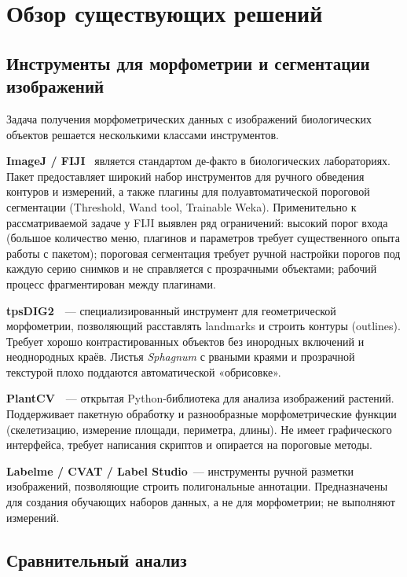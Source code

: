 
\section{Обзор существующих решений}
\label{sec:relatedworks}

\subsection{Инструменты для морфометрии и сегментации изображений}

Задача получения морфометрических данных с изображений биологических объектов решается несколькими классами инструментов.

\textbf{ImageJ / FIJI}~\cite{Schindelin2012} является стандартом де-факто в биологических
лабораториях. Пакет предоставляет широкий набор инструментов для ручного обведения контуров
и измерений, а также плагины для полуавтоматической пороговой сегментации (Threshold,
Wand tool, Trainable Weka). Применительно к рассматриваемой задаче у FIJI выявлен ряд
ограничений: высокий порог входа (большое количество меню, плагинов и параметров требует
существенного опыта работы с пакетом); пороговая сегментация требует ручной настройки порогов
под каждую серию снимков и не справляется с прозрачными объектами; рабочий процесс
фрагментирован между плагинами.

\textbf{tpsDIG2}~\cite{Rohlf2021}~--- специализированный инструмент для геометрической морфометрии,
позволяющий расставлять landmarks и строить контуры (outlines).
Требует хорошо контрастированных объектов без инородных включений и неоднородных краёв.
Листья \textit{Sphagnum} с рваными краями и прозрачной текстурой плохо поддаются автоматической «обрисовке».

\textbf{PlantCV}~\cite{Fahlgren2015}~--- открытая Python-библиотека для анализа изображений растений.
Поддерживает пакетную обработку и разнообразные морфометрические функции (скелетизацию, измерение площади,
периметра, длины). Не имеет графического интерфейса, требует написания скриптов и
опирается на пороговые методы.

\textbf{Labelme / CVAT / Label Studio}~--- инструменты ручной разметки изображений,
позволяющие строить полигональные аннотации. Предназначены для создания обучающих наборов данных,
а не для морфометрии; не выполняют измерений.

\subsection{Сравнительный анализ}

